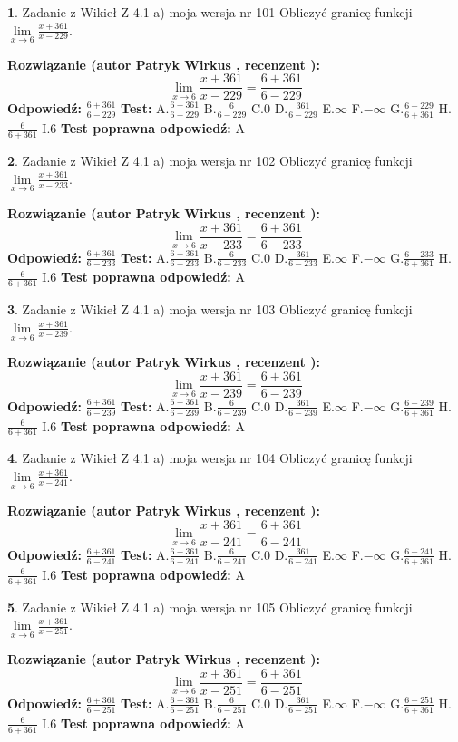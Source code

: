 \documentclass[12pt, a4paper]{article}
\theoremstyle{definition} %
\newtheorem{zad}{}
\newcommand{\zadStart}[1]{\begin{zad}#1\newline}
\newcommand{\zadStop}{\end{zad}}
\newcommand{\rozwStart}[2]{\noindent \textbf{Rozwiązanie (autor #1 , recenzent #2): }\newline}
\newcommand{\rozwStop}{\newline}
\newcommand{\odpStart}{\noindent \textbf{Odpowiedź:}\newline}
\newcommand{\odpStop}{\newline}
\newcommand{\testStart}{\noindent \textbf{Test:}\newline}
\newcommand{\testStop}{\newline}
\newcommand{\kluczStart}{\noindent \textbf{Test poprawna odpowiedź:}\newline}
\newcommand{\kluczStop}{\newline}
\begin{document}
\zadStart{Zadanie z Wikieł Z 4.1 a) moja wersja nr 101}
Obliczyć granicę funkcji $\lim\limits_{x\to6}\frac{x+361}{x-229}$.
\zadStop
\rozwStart{Patryk Wirkus}{}
$$\lim\limits_{x\to6}\frac{x+361}{x-229} = \frac{6+361}{6-229}$$
\rozwStop
\odpStart
$\frac{6+361}{6-229}$
\odpStop
\testStart
A.$\frac{6+361}{6-229}$
B.$\frac{6}{6-229}$
C.$0$
D.$\frac{361}{6-229}$
E.$\infty$
F.$-\infty$
G.$\frac{6-229}{6+361}$
H.$\frac{6}{6+361}$
I.$6$
\testStop
\kluczStart
A
\kluczStop



\zadStart{Zadanie z Wikieł Z 4.1 a) moja wersja nr 102}
Obliczyć granicę funkcji $\lim\limits_{x\to6}\frac{x+361}{x-233}$.
\zadStop
\rozwStart{Patryk Wirkus}{}
$$\lim\limits_{x\to6}\frac{x+361}{x-233} = \frac{6+361}{6-233}$$
\rozwStop
\odpStart
$\frac{6+361}{6-233}$
\odpStop
\testStart
A.$\frac{6+361}{6-233}$
B.$\frac{6}{6-233}$
C.$0$
D.$\frac{361}{6-233}$
E.$\infty$
F.$-\infty$
G.$\frac{6-233}{6+361}$
H.$\frac{6}{6+361}$
I.$6$
\testStop
\kluczStart
A
\kluczStop



\zadStart{Zadanie z Wikieł Z 4.1 a) moja wersja nr 103}
Obliczyć granicę funkcji $\lim\limits_{x\to6}\frac{x+361}{x-239}$.
\zadStop
\rozwStart{Patryk Wirkus}{}
$$\lim\limits_{x\to6}\frac{x+361}{x-239} = \frac{6+361}{6-239}$$
\rozwStop
\odpStart
$\frac{6+361}{6-239}$
\odpStop
\testStart
A.$\frac{6+361}{6-239}$
B.$\frac{6}{6-239}$
C.$0$
D.$\frac{361}{6-239}$
E.$\infty$
F.$-\infty$
G.$\frac{6-239}{6+361}$
H.$\frac{6}{6+361}$
I.$6$
\testStop
\kluczStart
A
\kluczStop



\zadStart{Zadanie z Wikieł Z 4.1 a) moja wersja nr 104}
Obliczyć granicę funkcji $\lim\limits_{x\to6}\frac{x+361}{x-241}$.
\zadStop
\rozwStart{Patryk Wirkus}{}
$$\lim\limits_{x\to6}\frac{x+361}{x-241} = \frac{6+361}{6-241}$$
\rozwStop
\odpStart
$\frac{6+361}{6-241}$
\odpStop
\testStart
A.$\frac{6+361}{6-241}$
B.$\frac{6}{6-241}$
C.$0$
D.$\frac{361}{6-241}$
E.$\infty$
F.$-\infty$
G.$\frac{6-241}{6+361}$
H.$\frac{6}{6+361}$
I.$6$
\testStop
\kluczStart
A
\kluczStop



\zadStart{Zadanie z Wikieł Z 4.1 a) moja wersja nr 105}
Obliczyć granicę funkcji $\lim\limits_{x\to6}\frac{x+361}{x-251}$.
\zadStop
\rozwStart{Patryk Wirkus}{}
$$\lim\limits_{x\to6}\frac{x+361}{x-251} = \frac{6+361}{6-251}$$
\rozwStop
\odpStart
$\frac{6+361}{6-251}$
\odpStop
\testStart
A.$\frac{6+361}{6-251}$
B.$\frac{6}{6-251}$
C.$0$
D.$\frac{361}{6-251}$
E.$\infty$
F.$-\infty$
G.$\frac{6-251}{6+361}$
H.$\frac{6}{6+361}$
I.$6$
\testStop
\kluczStart
A
\kluczStop
\end{document}
